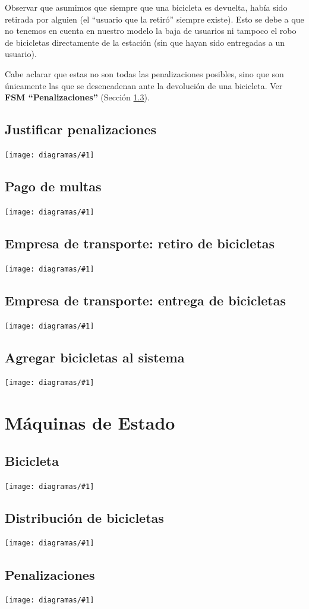 \documentclass[a4paper, 10pt, twoside]{article}
\newcommand{\diagramav}[1]{
  \texttt{[image: diagramas/\#1]}
}
\begin{document}
Observar que asumimos que siempre que una bicicleta es devuelta, había sido retirada por alguien (el ``usuario que la retiró'' siempre existe). Esto se debe a que no tenemos en cuenta en nuestro modelo la baja de usuarios ni tampoco el robo de bicicletas directamente de la estación (sin que hayan sido entregadas a un usuario).

Cabe aclarar que estas no son todas las penalizaciones posibles, sino que son únicamente las que se desencadenan ante la devolución de una bicicleta. Ver {\bf FSM ``Penalizaciones''} (Sección \ref{fsm:penalizaciones}).


\subsection{Justificar penalizaciones}

\diagramav{da-justificar-penalizacion}


\subsection{Pago de multas}

\diagramav{da-pago-de-multas}


\subsection{Empresa de transporte: retiro de bicicletas}

\diagramav{da-transporte-retiro}


\subsection{Empresa de transporte: entrega de bicicletas}

\diagramav{da-transporte-entrega}


\subsection{Agregar bicicletas al sistema}

\diagramav{da-agregar-bicicletas}




\section{Máquinas de Estado}


\subsection{Bicicleta}

\diagramav{fsm-bicicleta}


\subsection{Distribución de bicicletas}

\diagramav{fsm-distribucion-de-bicicletas}


\subsection{Penalizaciones}
\label{fsm:penalizaciones}

\diagramav{fsm-penalizaciones}
\end{document}
